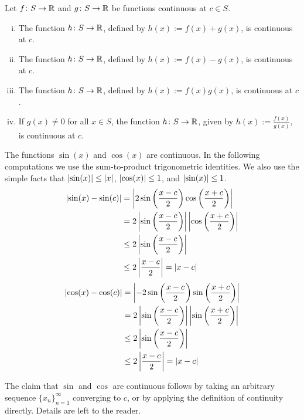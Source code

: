 \begin{prop} \label{contalg:prop}
Let $f \colon S \to {\mathbb{R}}$ and $g \colon S \to {\mathbb{R}}$ be functions
continuous at $c \in S$.
\begin{enumerate}[(i)]
\item The function $h \colon S \to {\mathbb{R}}$, defined by
$h(x) := f(x)+g(x)$, is continuous at $c$.
\item The function $h \colon S \to {\mathbb{R}}$, defined by
$h(x) := f(x)-g(x)$, is continuous at $c$.
\item The function $h \colon S \to {\mathbb{R}}$, defined by
$h(x) := f(x)g(x)$, is continuous at $c$.
\item If $g(x)\not=0$ for all $x \in S$, the function $h \colon S \to {\mathbb{R}}$,
given by $h(x) := \frac{f(x)}{g(x)}$, is continuous at $c$.
\end{enumerate}
\end{prop}

\begin{example} \label{sincos:example}
The functions $\sin(x)$ and $\cos(x)$ are continuous.
In the following computations we use the sum-to-product
trigonometric identities.  We also use the simple facts that
$\left\lvert {\sin(x)} \right\rvert \leq \left\lvert {x} \right\rvert$, $\left\lvert {\cos(x)} \right\rvert \leq 1$,
and $\left\lvert {\sin(x)} \right\rvert \leq 1$.
\begin{equation*}
\begin{split}
\left\lvert {\sin(x)-\sin(c)} \right\rvert & =
\left\lvert {
2 \sin \left( \frac{x-c}{2} \right) \cos \left( \frac{x+c}{2} \right)
} \right\rvert
\\
& =
2
\left\lvert { \sin \left( \frac{x-c}{2} \right) } \right\rvert
\left\lvert { \cos \left( \frac{x+c}{2} \right) } \right\rvert
\\
& \leq
2
\left\lvert { \sin \left( \frac{x-c}{2} \right) } \right\rvert
\\
& \leq
2
\left\lvert { \frac{x-c}{2} } \right\rvert
= \left\lvert {x-c} \right\rvert
\end{split}
\end{equation*}
\begin{equation*}
\begin{split}
\left\lvert {\cos(x)-\cos(c)} \right\rvert & =
\left\lvert {
-2 \sin \left( \frac{x-c}{2} \right) \sin \left( \frac{x+c}{2} \right)
} \right\rvert
\\
& =
2
\left\lvert { \sin \left( \frac{x-c}{2} \right) } \right\rvert
\left\lvert { \sin \left( \frac{x+c}{2} \right) } \right\rvert
\\
& \leq
2
\left\lvert { \sin \left( \frac{x-c}{2} \right) } \right\rvert
\\
& \leq
2
\left\lvert { \frac{x-c}{2} } \right\rvert
= \left\lvert {x-c} \right\rvert
\end{split}
\end{equation*}

The claim that $\sin$ and $\cos$ are continuous follows by taking an
arbitrary sequence $\{ x_n \}_{n=1}^\infty$ converging to $c$, or by applying the
definition of continuity directly.  Details are left to the
reader.
\end{example}

